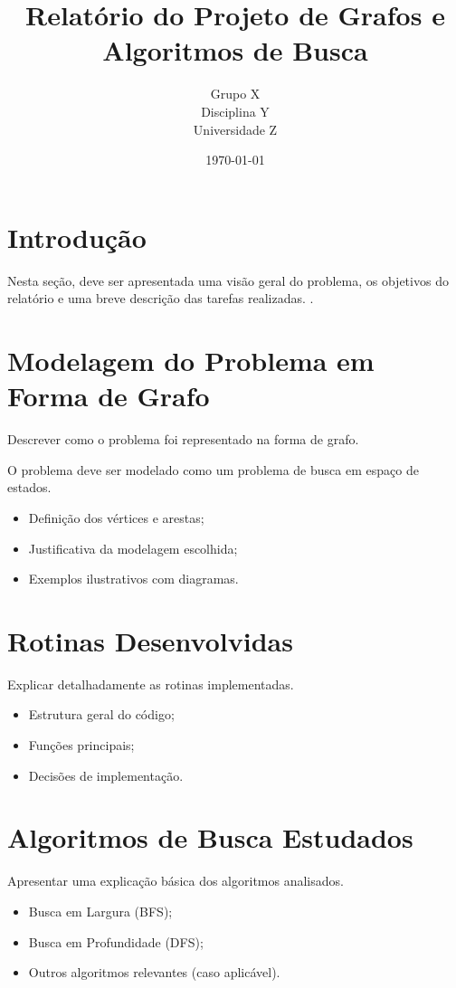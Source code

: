 \documentclass[12pt,a4paper]{article}
\title{Relatório do Projeto de Grafos e Algoritmos de Busca}
\author{Grupo X \\ Disciplina Y \\ Universidade Z}
\date{\today}
\begin{document}
\maketitle
\tableofcontents
\newpage

\section{Introdução}
Nesta seção, deve ser apresentada uma visão geral do problema, os objetivos do relatório e uma breve descrição das tarefas realizadas. 
\cite{cormen}.

\section{Modelagem do Problema em Forma de Grafo}
Descrever como o problema foi representado na forma de grafo.

O problema deve ser modelado como um problema de busca em espaço de estados.



\begin{itemize}
\item Definição dos vértices e arestas;
\item Justificativa da modelagem escolhida;
\item Exemplos ilustrativos com diagramas.
\end{itemize}

\section{Rotinas Desenvolvidas}
Explicar detalhadamente as rotinas implementadas.
\begin{itemize}
\item Estrutura geral do código;
\item Funções principais;
\item Decisões de implementação.
\end{itemize}

\section{Algoritmos de Busca Estudados}
Apresentar uma explicação básica dos algoritmos analisados.
\begin{itemize}
\item Busca em Largura (BFS);
\item Busca em Profundidade (DFS);
\item Outros algoritmos relevantes (caso aplicável).
\end{itemize}
\end{document}
